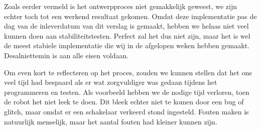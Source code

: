 \documentclass{report}
\begin{document}
Zoals eerder vermeld is het ontwerpproces niet gemakkelijk geweest, we zijn echter toch tot een werkend resultaat gekomen. Omdat deze implementatie pas de dag van de inleverdatum van dit verslag is gemaakt, hebben we helaas niet veel kunnen doen aan stabiliteitstesten. Perfect zal het dus niet zijn, maar het is wel de meest stabiele implementatie die wij in de afgelopen weken hebben gemaakt. Desalniettemin is aan alle eisen voldaan.

Om even kort te reflecteren op het proces, zouden we kunnen stellen dat het ons veel tijd had bespaard als er wat zorgvuldiger was gedaan tijdens het programmeren en testen. Als voorbeeld hebben we de nodige tijd verloren, toen de robot het niet leek te doen. Dit bleek echter niet te komen door een bug of glitch, maar omdat er een schakelaar verkeerd stond ingesteld.
Fouten maken is natuurlijk menselijk, maar het aantal fouten had kleiner kunnen zijn.
\end{document}
